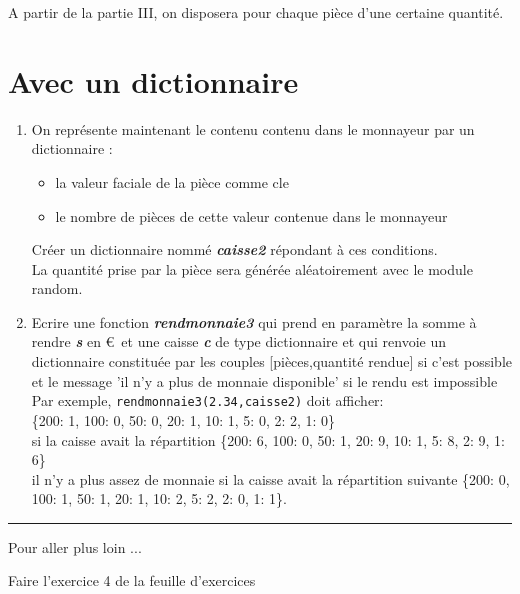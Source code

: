 \documentclass[12pt,french]{article}
\begin{document}
 A partir de la partie III, on disposera pour chaque pièce d'une certaine quantité.

\section{Avec un dictionnaire}

\begin{enumerate}
	\item On représente maintenant le contenu contenu dans le monnayeur par un dictionnaire :
	\begin{itemize}[$\bullet$]
		\item la valeur faciale de la pièce comme cle
		\item le nombre de pièces de cette valeur contenue dans le monnayeur
	\end{itemize}
	Créer un dictionnaire nommé \textbf{\textsl{caisse2}} répondant à ces conditions.\\
	La quantité prise par la pièce sera générée aléatoirement avec le module random.
	\item Ecrire une fonction \textbf{\textsl{rendmonnaie3}} qui prend en paramètre la somme à rendre \textbf{\textsl{s}} en \euro\, et une caisse \textbf{\textsl{c}} de type dictionnaire et qui renvoie un dictionnaire constituée par les couples [pièces,quantité rendue] si c'est possible et le message 'il n'y a plus de monnaie disponible' si le rendu est impossible\\
	Par exemple,  \texttt{rendmonnaie3(2.34,caisse2)}
	doit afficher: \\
	\{200: 1, 100: 0, 50: 0, 20: 1, 10: 1, 5: 0, 2: 2, 1: 0\}\\
	si la caisse avait la répartition \{200: 6, 100: 0, 50: 1, 20: 9, 10: 1, 5: 8, 2: 9, 1: 6\}\\
	il n'y a plus assez de monnaie si la caisse avait la répartition suivante \{200: 0, 100: 1, 50: 1, 20: 1, 10: 2, 5: 2, 2: 0, 1: 1\}.\\
\end{enumerate}	
\hrule
\medskip
\begin{center} 
Pour aller plus loin ... \end{center}
\begin{center} Faire l'exercice 4 de la feuille d'exercices \end{center}
\end{document}
